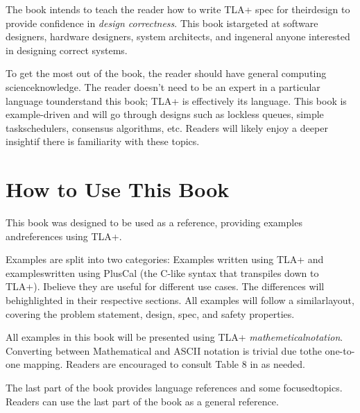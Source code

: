 The book intends to teach the reader how to write TLA+ spec for theirdesign to
provide confidence in \textit{design correctness}. This book istargeted at
software designers, hardware designers, system architects, and ingeneral anyone
interested in designing correct systems.\newline 

To get the most out of the book, the reader should have general computing
scienceknowledge. The reader doesn't need to be an expert in a particular
language tounderstand this book; TLA+ is effectively its language. This book is
example-driven and will go through designs such as lockless queues, simple
taskschedulers, consensus algorithms, etc. Readers will likely enjoy a deeper
insightif there is familiarity with these topics.

\section{How to Use This Book}

This book was designed to be used as a reference, providing examples
andreferences using TLA+.\newline

Examples are split into two categories: Examples written using TLA+ and
exampleswritten using PlusCal (the C-like syntax that transpiles down to TLA+).
Ibelieve they are useful for different use cases. The differences will
behighlighted in their respective sections. All examples will follow a
similarlayout, covering the problem statement, design, spec, and safety
properties.\newline

All examples in this book will be presented using TLA+
\textit{mathemeticalnotation}. Converting between Mathematical and ASCII
notation is trivial due tothe one-to-one mapping. Readers are encouraged to
consult Table 8 in \cite{ss} as needed.\newline

The last part of the book provides language references and some focusedtopics.
Readers can use the last part of the book as a general reference. 
